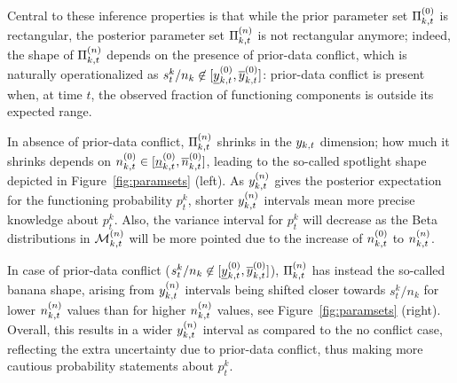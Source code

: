 \documentclass[12pt, a4paper]{elsarticle}
\begin{document}
Central to these inference properties is that
while the prior parameter set $\Pi^{(0)}_{k,t}$ is rectangular,
the posterior parameter set $\Pi^{(n)}_{k,t}$ is not rectangular anymore;
indeed, the shape of $\Pi^{(n)}_{k,t}$ depends on the presence of prior-data conflict,
which is naturally operationalized as $s^k_t/n_k \not\in [\underline{y}^{(0)}_{k,t}, \overline{y}^{(0)}_{k,t}]$:
prior-data conflict is present when, at time $t$, the observed fraction of functioning components
is outside its expected range.

In absence of prior-data conflict, 
$\Pi^{(n)}_{k,t}$ shrinks in the $y_{k,t}$ dimension;
how much it shrinks depends on $n^{(0)}_{k,t} \in [\underline{n}^{(0)}_{k,t}, \overline{n}^{(0)}_{k,t}]$,
leading to the so-called spotlight shape depicted in Figure~\ref{fig:paramsets} (left).
As $y^{(n)}_{k,t}$ gives the posterior expectation for the functioning probability $p_t^k$,
shorter $y^{(n)}_{k,t}$ intervals mean more precise knowledge about $p_t^k$.
Also, the variance interval for $p_t^k$ will decrease
as the Beta distributions in $\mathcal{M}^{(n)}_{k,t}$ will be more pointed
due to the increase of $n^{(0)}_{k,t}$ to $n^{(n)}_{k,t}$.

In case of prior-data conflict ($s^k_t/n_k \not\in [\underline{y}^{(0)}_{k,t}, \overline{y}^{(0)}_{k,t}]$),
$\Pi^{(n)}_{k,t}$ has instead the so-called banana shape,
arising from $y^{(n)}_{k,t}$ intervals being shifted closer towards $s^k_t/n_k$
for lower $n^{(n)}_{k,t}$ values than for higher $n^{(n)}_{k,t}$ values, see Figure~\ref{fig:paramsets} (right).
Overall, this results in a wider $y^{(n)}_{k,t}$ interval as compared to the no conflict case, 
reflecting the extra uncertainty due to prior-data conflict,
thus making more cautious probability statements about $p_t^k$.
\end{document}
